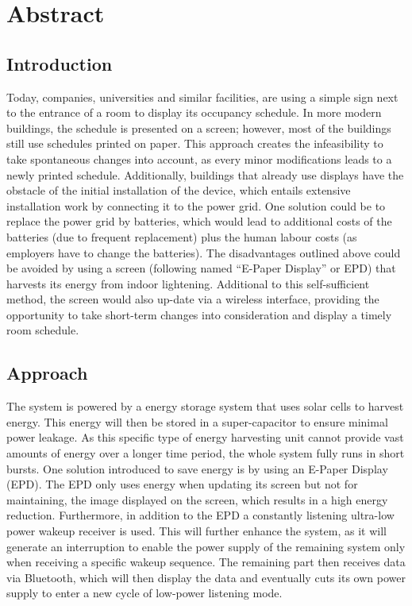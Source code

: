\chapter*{Abstract}

\section*{Introduction}
Today, companies, universities and similar facilities, are using a simple sign next to the entrance of a room to display its occupancy schedule. In more modern buildings, the schedule is presented on a screen; however, most of the buildings still use schedules printed on paper. This approach creates the infeasibility to take spontaneous changes into account, as every minor modifications leads to a newly printed schedule. Additionally, buildings that already use displays have the obstacle of the initial installation of the device, which entails extensive installation work by connecting it to the power grid. One solution could be to replace the power grid by batteries, which would lead to additional costs of the batteries (due to frequent replacement) plus the human labour costs (as employers have to change the batteries). The disadvantages outlined above could be avoided by using a screen (following named “E-Paper Display” or EPD) that harvests its energy from indoor lightening. Additional to this self-sufficient method, the screen would also up-date via a wireless interface, providing the opportunity to take short-term changes into consideration and display a timely room schedule. 

\section*{Approach}
The system is powered by a energy storage system that uses solar cells to harvest energy. This energy will then be stored in a super-capacitor to ensure minimal power leakage. As this specific type of energy harvesting unit cannot provide vast amounts of energy over a longer time period, the whole system fully runs in short bursts. One solution introduced to save energy is by using an E-Paper Display (EPD). The EPD only uses energy when updating its screen but not for maintaining, the image displayed on the screen, which results in a high energy reduction.   Furthermore, in addition to the EPD a constantly listening ultra-low power wakeup receiver is used. This will further enhance the system, as it will generate an interruption to enable the power supply of the remaining system only when receiving a specific wakeup sequence. The remaining part then receives data via Bluetooth, which will then display the data and eventually cuts its own power supply to enter a new cycle of low-power listening mode.


